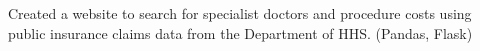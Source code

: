 \documentclass[]{deedy-resume-openfont}
\begin{document}
\begin{minipage}[t]{0.66\textwidth}
\begin{tightemize}
\item Created a website to search for specialist doctors and procedure costs using public insurance claims data from the Department of HHS. (Pandas, Flask)
\end{tightemize}




\end{minipage}
\end{document}
